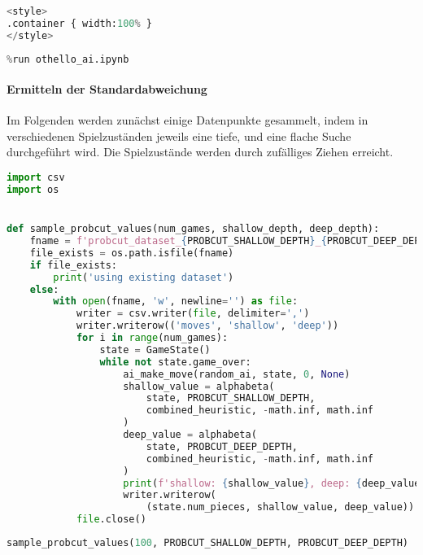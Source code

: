 \begin{lstlisting}[language=Python]
%%HTML
<style>
.container { width:100% }
</style>
\end{lstlisting}

\begin{lstlisting}[language=Python]
%run othello_game.ipynb
%run othello_ai.ipynb
\end{lstlisting}

\hypertarget{ermitteln-der-standardabweichung}{%
\paragraph{Ermitteln der
Standardabweichung}\label{ermitteln-der-standardabweichung}}

Im Folgenden werden zunächst einige Datenpunkte gesammelt, indem in
verschiedenen Spielzuständen jeweils eine tiefe, und eine flache Suche
durchgeführt wird. Die Spielzustände werden durch zufälliges Ziehen
erreicht.

\begin{lstlisting}[language=Python]
import csv
import os


def sample_probcut_values(num_games, shallow_depth, deep_depth):
    fname = f'probcut_dataset_{PROBCUT_SHALLOW_DEPTH}_{PROBCUT_DEEP_DEPTH}.csv'
    file_exists = os.path.isfile(fname)
    if file_exists:
        print('using existing dataset')
    else:
        with open(fname, 'w', newline='') as file:
            writer = csv.writer(file, delimiter=',')
            writer.writerow(('moves', 'shallow', 'deep'))
            for i in range(num_games):
                state = GameState()
                while not state.game_over:
                    ai_make_move(random_ai, state, 0, None)
                    shallow_value = alphabeta(
                        state, PROBCUT_SHALLOW_DEPTH,
                        combined_heuristic, -math.inf, math.inf
                    )
                    deep_value = alphabeta(
                        state, PROBCUT_DEEP_DEPTH,
                        combined_heuristic, -math.inf, math.inf
                    )
                    print(f'shallow: {shallow_value}, deep: {deep_value}')
                    writer.writerow(
                        (state.num_pieces, shallow_value, deep_value))
            file.close()
\end{lstlisting}

\begin{lstlisting}[language=Python]
sample_probcut_values(100, PROBCUT_SHALLOW_DEPTH, PROBCUT_DEEP_DEPTH)
\end{lstlisting}

